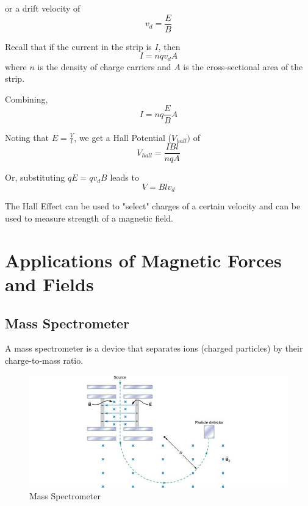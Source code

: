 \documentclass[14pt]{memoir}
\begin{document}
or a drift velocity of 
\begin{equation}
v_d = \frac{E}{B}
\end{equation}

Recall that if the current in the strip is $I$, then 
\begin{equation}
I = n q v_d A
\end{equation}
where $n$ is the density of charge carriers and $A$ is the cross-sectional area of the strip. 

Combining,
\begin{equation}
I = n q \frac{E}{B} A
\end{equation}

Noting that $E = \frac{V}{l}$, we get a Hall Potential ($V_{hall})$ of
\begin{equation}
V_{hall} = \frac{I B l}{n q A}
\end{equation}

Or, substituting $qE = q v_d B$ leads to
\begin{equation}
V = B l v_d
\end{equation}

The Hall Effect can be used to "select" charges of a certain velocity and can be used to measure strength of a magnetic field.

\section{Applications of Magnetic Forces and Fields}

\subsection{Mass Spectrometer}

A mass spectrometer is a device that separates ions (charged particles) by their charge-to-mass ratio. 

\begin{figure}[H]
\begin{center}
\includegraphics[scale=0.50]{fig/fig_11_19.jpg}
\caption{Mass Spectrometer}
\label{fig:11_19}
\end{center}
\end{figure}
\end{document}
